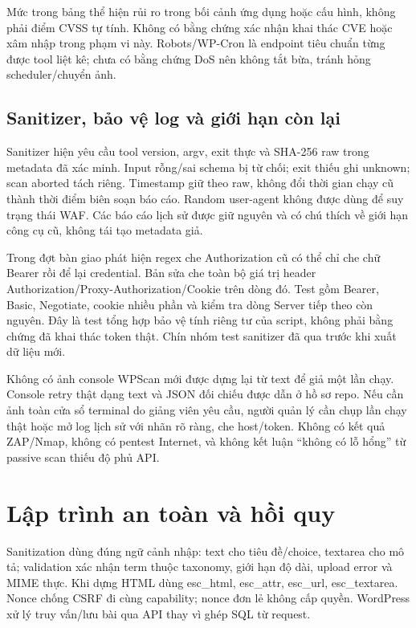 Mức trong bảng thể hiện rủi ro trong bối cảnh ứng dụng hoặc cấu hình, không phải điểm CVSS tự tính. Không có bằng chứng xác nhận khai thác CVE hoặc xâm nhập trong phạm vi này. Robots/WP-Cron là endpoint tiêu chuẩn từng được tool liệt kê; chưa có bằng chứng DoS nên không tắt bừa, tránh hỏng scheduler/chuyển ảnh.

\subsection{Sanitizer, bảo vệ log và giới hạn còn lại}
Sanitizer hiện yêu cầu tool version, argv, exit thực và SHA-256 raw trong metadata đã xác minh. Input rỗng/sai schema bị từ chối; exit thiếu ghi unknown; scan aborted tách riêng. Timestamp giữ theo raw, không đổi thời gian chạy cũ thành thời điểm biên soạn báo cáo. Random user-agent không được dùng để suy trạng thái WAF. Các báo cáo lịch sử được giữ nguyên và có chú thích về giới hạn công cụ cũ, không tái tạo metadata giả.

Trong đợt bàn giao phát hiện regex che Authorization cũ có thể chỉ che chữ Bearer rồi để lại credential. Bản sửa che toàn bộ giá trị header Authorization/Proxy-Authorization/Cookie trên dòng đó. Test gồm Bearer, Basic, Negotiate, cookie nhiều phần và kiểm tra dòng Server tiếp theo còn nguyên. Đây là test tổng hợp bảo vệ tính riêng tư của script, không phải bằng chứng đã khai thác token thật. Chín nhóm test sanitizer đã qua trước khi xuất dữ liệu mới.

Không có ảnh console WPScan mới được dựng lại từ text để giả một lần chạy. Console retry thật dạng text và JSON đối chiếu được dẫn ở hồ sơ repo. Nếu cần ảnh toàn cửa sổ terminal do giảng viên yêu cầu, người quản lý cần chụp lần chạy thật hoặc mở log lịch sử với nhãn rõ ràng, che host/token. Không có kết quả ZAP/Nmap, không có pentest Internet, và không kết luận ``không có lỗ hổng'' từ passive scan thiếu độ phủ API.

\section{Lập trình an toàn và hồi quy}
Sanitization dùng đúng ngữ cảnh nhập: text cho tiêu đề/choice, textarea cho mô tả; validation xác nhận term thuộc taxonomy, giới hạn độ dài, upload error và MIME thực. Khi dựng HTML dùng esc\_html, esc\_attr, esc\_url, esc\_textarea. Nonce chống CSRF đi cùng capability; nonce đơn lẻ không cấp quyền. WordPress xử lý truy vấn/lưu bài qua API thay vì ghép SQL từ request.

